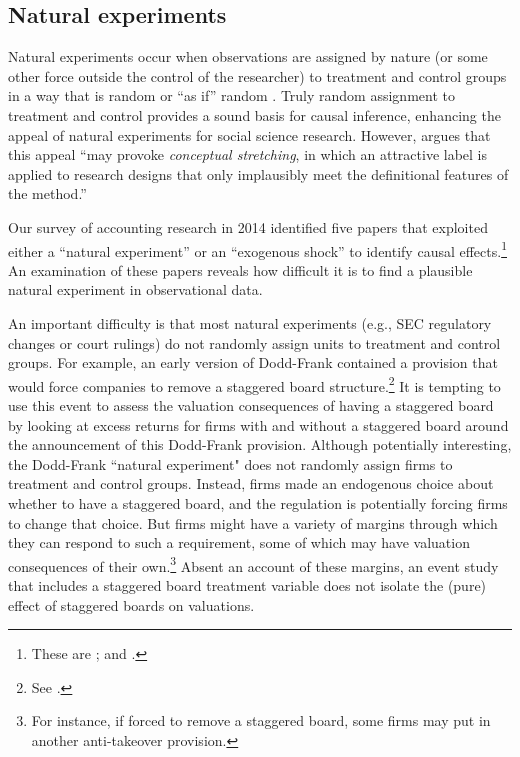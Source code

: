 \documentclass[12pt,reqno,titlepage]{amsart}
\theoremstyle{definition}
\begin{document}
\begin{doublespace}
\subsection{Natural experiments}
Natural experiments occur when observations are assigned by nature (or some other force outside the control of the researcher) to treatment and control groups in a way that is random or ``as if'' random \citep{Dunning:2012tt}. 
Truly random assignment to treatment and control provides a sound basis for causal inference, enhancing the appeal of natural experiments for social science research.
However, \citet[\,p.3, emphasis added]{Dunning:2012tt} argues that this appeal ``may provoke \emph{conceptual stretching}, in which an attractive label is applied to research designs that only implausibly meet the definitional features of the method.'' 

Our survey of accounting research in 2014 identified five papers that exploited either a ``natural experiment'' or an ``exogenous shock'' to identify causal effects.\footnote{These are \citet{Lo:2013jk,Aier:2014ii,Kirk:2014gx,Houston:2014hv}; and \citet{Hail:2014fq}.}
An examination of these papers reveals how difficult it is to find a plausible natural experiment in observational data.

An important difficulty is that most natural experiments (e.g., SEC regulatory changes or court rulings) do not randomly assign 
units to treatment and control groups.
For example, an early version of Dodd-Frank contained a provision that would force companies to remove a staggered board structure.\footnote{See \citet{Larcker:2011hs}.}
It is tempting to use this event to assess the valuation consequences of having a staggered board by looking at excess returns for firms with and without a staggered board around the announcement of this Dodd-Frank provision.
Although potentially interesting, the Dodd-Frank ``natural experiment" does not randomly assign firms to treatment and control groups.  Instead, firms made an endogenous choice about whether to have a staggered board, and the regulation is potentially forcing firms to change that choice. But firms might have a variety of margins through which they can respond to such a requirement, some of which may have valuation consequences of their own.\footnote{For instance, if forced to remove a staggered board, some firms may put in another anti-takeover provision.} Absent an account of these margins, an event study that includes a staggered board treatment variable does not isolate the (pure) effect of staggered boards on valuations. 


\end{doublespace}
\end{document}
